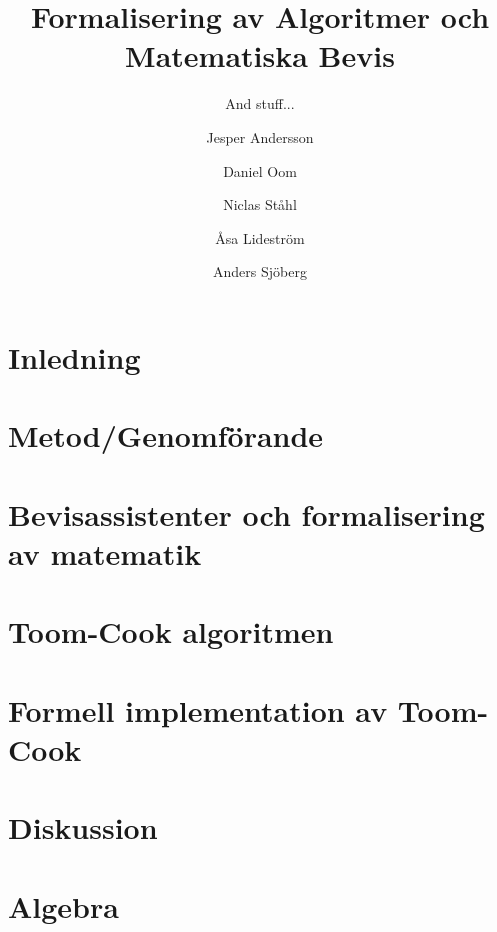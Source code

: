 \documentclass[bachelors,a4paper,gu]{chalmers-thesis}
\title{Formalisering av Algoritmer och Matematiska Bevis}
\subtitle{And stuff...}
\author{Jesper Andersson\and Daniel Oom\and Niclas Ståhl\and Åsa Lideström\and Anders Sjöberg}
\begin{document}
\maketitle

\chapter{Inledning}


\newpage
\chapter{Metod/Genomförande}


\newpage
\chapter{Bevisassistenter och formalisering av matematik}


\newpage
\chapter{\coq}




\newpage
\chapter{Toom-Cook algoritmen}






\newpage
\chapter{Formell implementation av Toom-Cook}



\newpage
\chapter{Diskussion}







\newpage
\nocite{*}
\printbibliography

\appendix
\newpage
\chapter{Algebra}

\end{document}
